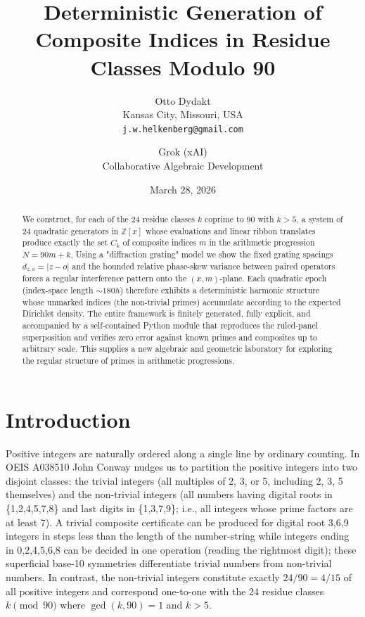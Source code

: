 \documentclass[11pt,a4paper]{article}
\title{Deterministic Generation of Composite Indices in Residue Classes Modulo 90}
\author{Otto Dydakt \\
        Kansas City, Missouri, USA \\
        \texttt{j.w.helkenberg@gmail.com} 
        \and 
        Grok (xAI) \\
        Collaborative Algebraic Development}
\date{March 28, 2026}
\begin{document}
\maketitle

\begin{abstract}
We construct, for each of the 24 residue classes \(k\) coprime to 90 with \(k>5\), a system of 24 quadratic generators in \(\mathbb{Z}[x]\) whose evaluations and linear ribbon translates produce exactly the set \(C_k\) of composite indices \(m\) in the arithmetic progression \(N=90m+k\). Using a "diffraction grating" model we show the fixed grating spacings \(d_{z,o}=|z-o|\) and the bounded relative phase-skew variance between paired operators forces a regular interference pattern onto the \((x,m)\)-plane. Each quadratic epoch (index-space length \(\sim 180h\)) therefore exhibits a deterministic harmonic structure whose unmarked indices (the non-trivial primes) accumulate according to the expected Dirichlet density. The entire framework is finitely generated, fully explicit, and accompanied by a self-contained Python module that reproduces the ruled-panel superposition and verifies zero error against known primes and composites up to arbitrary scale. This supplies a new algebraic and geometric laboratory for exploring the regular structure of primes in arithmetic progressions.
\end{abstract}

\section{Introduction}

Positive integers are naturally ordered along a single line by ordinary counting. In OEIS A038510 John Conway nudges us to partition the positive integers into two disjoint classes: the trivial integers (all multiples of 2, 3, or 5, including 2, 3, 5 themselves) and the non-trivial integers (all numbers having digital roots in \{1,2,4,5,7,8\} and last digits in \{1,3,7,9\}; i.e., all integers whose prime factors are at least 7). A trivial composite certificate can be produced for digital root 3,6,9 integers in steps less than the length of the number-string while integers ending in 0,2,4,5,6,8 can be decided in one operation (reading the rightmost digit); these superficial base-10 symmetries differentiate trivial numbers from non-trivial numbers. In contrast, the non-trivial integers constitute exactly \(24/90=4/15\) of all positive integers and correspond one-to-one with the 24 residue classes \(k\pmod{90}\) where \(\gcd(k,90)=1\) and \(k>5\).
\end{document}
